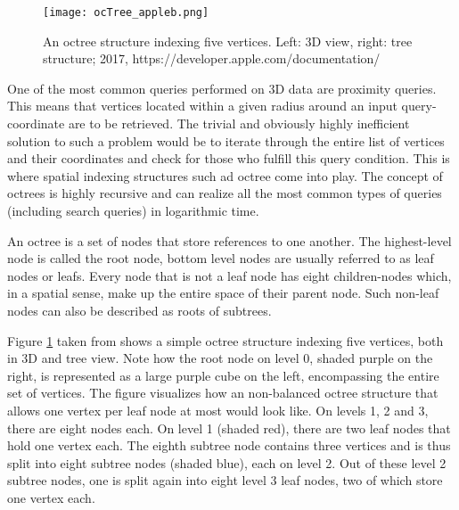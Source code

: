 \begin{figure}[htb]
  \centering
  \texttt{[image: ocTree\_appleb.png]}\\ %
  \caption{An octree structure indexing five vertices. Left: 3D view, right: tree structure; 2017, https://developer.apple.com/documentation/}\label{fig:ocTree_apple}
\end{figure}

One of the most common queries performed on 3D data are proximity queries. This means that vertices located within a given radius around an input query-coordinate are to be retrieved. The trivial and obviously highly inefficient solution to such a problem would be to iterate through the entire list of vertices and their coordinates and check for those who fulfill this query condition. This is where spatial indexing structures such ad octree come into play. The concept of octrees is highly recursive and can realize all the most common types of queries (including search queries) in logarithmic time.

An octree is a set of nodes that store references to one another. The highest-level node is called the root node, bottom level nodes are usually referred to as leaf nodes or leafs. Every node that is not a leaf node has eight children-nodes which, in a spatial sense, make up the entire space of their parent node. Such non-leaf nodes can also be described as roots of subtrees.

Figure \ref{fig:ocTree_apple} taken from \cite{octAp} shows a simple octree structure indexing five vertices, both in 3D and tree view. Note how the root node on level 0, shaded purple on the right, is represented as a large purple cube on the left, encompassing the entire set of vertices. The figure visualizes how an non-balanced octree structure that allows one vertex per leaf node at most would look like. On levels 1, 2 and 3, there are eight nodes each. On level 1 (shaded red), there are two leaf nodes that hold one vertex each. The eighth subtree node contains three vertices and is thus split into eight subtree nodes (shaded blue), each on level 2. Out of these level 2 subtree nodes, one is split again into eight level 3 leaf nodes, two of which store one vertex each.

